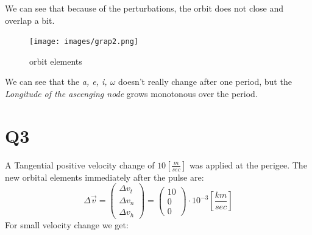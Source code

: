 \documentclass[11pt, a4paper]{article}
\begin{document}
\noindent We can see that because of the perturbations, the orbit does not close and overlap a bit.
\begin{figure}[H]
    \begin{center}
    \texttt{[image: images/grap2.png]}
    \caption{orbit elements}
    \end{center}
\end{figure}
We can see that the \emph{a, e, i, $\omega$} doesn't really change after one period, but the \emph{Longitude of the ascenging node} grows monotonous over the period.
\newpage

\section{Q3}
A Tangential positive velocity change of $10\left[\frac{m}{sec}\right]$ was applied at the perigee. The new orbital elements immediately after the pulse are:
\begin{equation}
    \Delta\vec{v} = \begin{pmatrix}
        \Delta v_t \\
        \Delta v_n \\
        \Delta v_h
    \end{pmatrix}
    =
    \begin{pmatrix}
        10 \\ 0 \\ 0
    \end{pmatrix}
    \cdot 10^{-3} \left[\frac{km}{sec}\right]
\end{equation}
For small velocity change we get:
\end{document}
